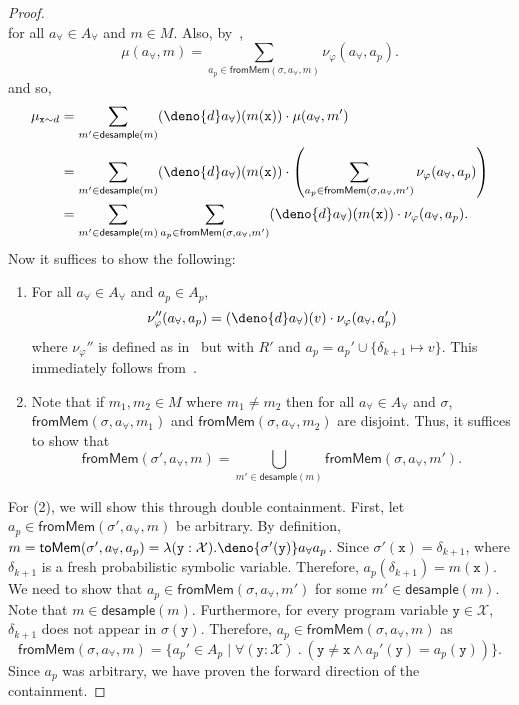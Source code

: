 \documentclass[acmsmall,review,anonymous]{acmart}\settopmatter{printfolios=true,printccs=false,printacmref=false}
\begin{document}
\begin{proof}
\[  \]
  for all $a_{\forall} \in \mathit{A}_{\forall}$ and $m \in \mathit{M}$. Also, by~,
  \[
    \mu(a_{\forall},m) = \sum_{a_p \in \mathsf{fromMem}(\sigma,a_{\forall},m)} \nu_{\varphi}(a_{\forall},a_p).
  \]
  and so,
  \begin{align*}
    \mu_{\mathtt{x} \sim d} &= \sum_{m' \in \mathsf{desample}(m)} (\deno{d}a_{\forall})(m(\mathtt{x})) \cdot \mu(a_{\forall},m')\\
                            &= \sum_{m' \in \mathsf{desample}(m)} (\deno{d}a_{\forall})(m(\mathtt{x})) \cdot \left( \sum_{a_p \in \mathsf{fromMem}(\sigma,a_{\forall},m')} \nu_{\varphi}(a_{\forall},a_p) \right)\\
                            &= \sum_{m' \in \mathsf{desample}(m)} \sum_{a_p \in \mathsf{fromMem}(\sigma,a_{\forall},m')} (\deno{d}a_{\forall})(m(\mathtt{x})) \cdot \nu_{\varphi}(a_{\forall},a_p).
  \end{align*}
  Now it suffices to show the following:
  \begin{enumerate}
  \item For all $a_{\forall}\in \mathit{A}_{\forall}$ and $a_p \in \mathit{A}_p$,
    \[
      \nu_{\varphi}''(a_{\forall},a_p) = (\deno{d}a_{\forall})(v) \cdot \nu_{\varphi}(a_{\forall},a_p')
    \]
    where $\nu_{\varphi}''$ is defined as in~ but with $R'$ and $a_p = a_p' \cup \{\delta_{k+1} \mapsto v\}$. This immediately follows from~.
  \item Note that if $m_1,m_2 \in \mathit{M}$ where $m_1\neq m_2$ then for all $a_{\forall} \in \mathit{A}_{\forall}$ and $\sigma$, $\mathsf{fromMem}(\sigma,a_{\forall},m_1)$ and $\mathsf{fromMem}(\sigma,a_{\forall},m_2)$ are disjoint. Thus, it suffices to show that
    \[
      \mathsf{fromMem}(\sigma',a_{\forall},m) = \bigcup_{m' \in \mathsf{desample}(m)} \mathsf{fromMem}(\sigma,a_{\forall},m').
    \]
  \end{enumerate}
  For (2), we will show this through double containment. First, let $a_p \in \mathsf{fromMem}(\sigma',a_{\forall},m)$ be arbitrary. By definition,
  $m = \mathsf{toMem}(\sigma',a_{\forall},a_p) = \lambda (\mathtt{y} : \mathcal{X}) . \deno{\sigma'(\mathtt{y})}a_{\forall}a_p$. Since $\sigma'(\mathtt{x}) = \delta_{k+1}$, where $\delta_{k+1}$ is a fresh probabilistic symbolic variable. Therefore, $a_p(\delta_{k+1}) = m(\mathtt{x})$. We need to show that $a_p \in \mathsf{fromMem}(\sigma,a_{\forall},m')$ for some $m' \in \mathsf{desample}(m)$. Note that $m \in \mathsf{desample}(m)$. Furthermore, for every program variable $\mathtt{y} \in \mathcal{X}$, $\delta_{k+1}$ does not appear in $\sigma(\mathtt{y})$. Therefore, $a_p \in \mathsf{fromMem}(\sigma,a_{\forall},m)$ as
  \[
    \mathsf{fromMem}(\sigma,a_{\forall},m) = \{ a_p' \in \mathit{A}_p \mid \forall (\mathtt{y} : \mathcal{X})~.~(\mathtt{y} \neq \mathtt{x} \wedge a_p'(\mathtt{y}) = a_p(\mathtt{y}))\}.
  \]
  Since $a_p$ was arbitrary, we have proven the forward direction of the containment.


\end{proof}
\end{document}
